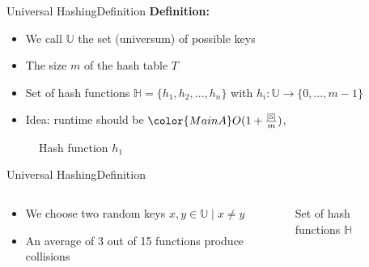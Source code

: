 
\begin{frame}{Universal Hashing}{Definition}
  \textbf{Definition:}
  \begin{itemize}
    \item<1->
      We call {\color{MainA}$\mathbb{U}$} the set (universum) of
      possible keys
    \item<2->
      The size {\color{MainA}$m$} of the hash table {\color{MainA}$T$}
    \item<3->
      Set of hash functions
      {\color{MainA}$\mathbb{H} = \{h_1, h_2,\dots, h_n\}$} with
      {\color{MainA}$h_i: \mathbb{U} \to \{0,\dots, m - 1\}$}
    \item<5-> Idea: runtime should be
      $\color{MainA} O(1+\frac{\vert \mathbb{S}\vert}{m})$,
  \end{itemize}%
  \begin{figure}[!b]%
    \begin{adjustbox}{height=0.32\linewidth}%
    \end{adjustbox}
    \vspace*{-1.0em}%
    \caption{Hash function $h_1$}%
    \label{fig:universal_hashing:hash_function_definition}
  \end{figure}
\end{frame}


\begin{frame}{Universal Hashing}{Definition}
  \begin{columns}
    \begin{column}{0.5\linewidth}
      \begin{itemize}
        \item<1->
          We choose two random keys
          {\color{MainA}$x, y \in \mathbb{U} \mid x \neq y$}
        \item<2->
          An average of 3 out of 15 functions produce collisions
      \end{itemize}
    \end{column}
    \begin{column}{0.5\linewidth}
      \begin{figure}[!t]%
        \begin{adjustbox}{width=\linewidth}
        \end{adjustbox}
        \caption{Set of hash functions $\mathbb{H}$}%
        \label{fig:universal_hashing:hash_universe}
      \end{figure}
    \end{column}
  \end{columns}
\end{frame}

